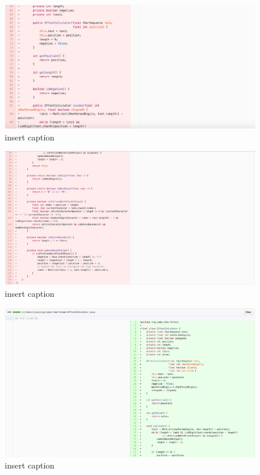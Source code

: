 \begin{figure}[H]
	\centering
	\includegraphics[width=\linewidth]{code25}
	\caption{insert caption}
\end{figure}
\begin{figure}[H]
	\centering
	\includegraphics[width=\linewidth]{code26}
	\caption{insert caption}
\end{figure}
\begin{figure}[H]
	\centering
	\includegraphics[width=\linewidth]{code27}
	\caption{insert caption}
\end{figure}
